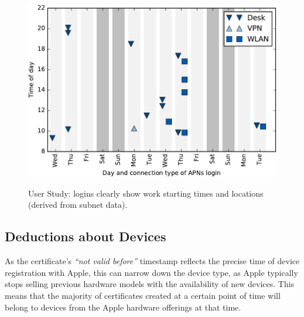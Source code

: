\begin{figure}%
	\centering
		\href{https://github.com/tumi8/cca-privacy/blob/master/userstudy/userstudy.ipynb}{%
		\includegraphics[width=.94\columnwidth]{figures/userstudy-crop.pdf}%
		}
		\caption{User Study: {\apns} logins clearly show work starting times and locations (derived from subnet data).}
		\label{fig:userstudy-1}
		\vspace{-3mm}
\end{figure}
\subsection{Deductions about Devices}

As the certificate's \emph{``not valid before''} timestamp reflects the precise time of device registration with Apple, this can narrow down the device type, as Apple typically stops selling
previous hardware models with the availability of new devices. This means that
the majority of certificates created at a certain point of time will belong to devices from the Apple hardware offerings at that time.

